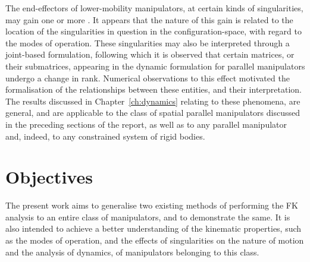 \documentclass[DD]{iitmdiss}
\newcommand{\mref}[1]{\ref{#1}}
\begin{document}
The end-effectors of lower-mobility manipulators, at certain kinds of singularities, may gain one or more \dofs. It appears that the nature of this gain is related to the location of the singularities in question in the configuration-space, with regard to the modes of operation. These singularities may also be interpreted through a joint-based formulation, following which it is observed that certain matrices, or their submatrices, appearing in the dynamic formulation for parallel manipulators undergo a change in rank. Numerical observations to this effect motivated the formalisation of the relationships between these entities, and their interpretation. The results discussed in Chapter~\mref{ch:dynamics} relating to these phenomena, are general, and are applicable to the class of spatial parallel manipulators discussed in the preceding sections of the report, as well as to any parallel manipulator and, indeed, to any constrained system of rigid bodies.
%
\section{Objectives}
%
The present work aims to generalise two existing methods of performing the FK analysis to an entire class of manipulators, and to demonstrate the same. It is also intended to achieve a better understanding of the kinematic properties, such as the modes of operation, and the effects of singularities on the nature of motion and the analysis of dynamics, of manipulators belonging to this class.
%
\end{document}
